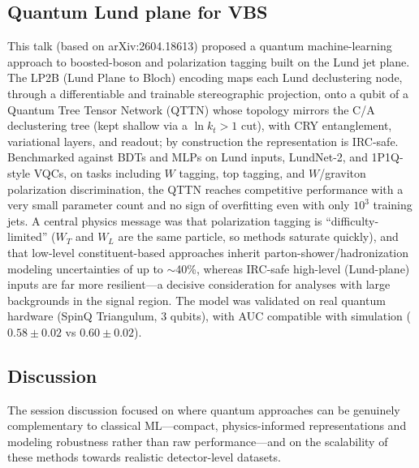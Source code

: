 \subsection{Quantum Lund plane for VBS}
This talk (based on arXiv:2604.18613) proposed a quantum machine-learning
approach to boosted-boson and polarization tagging built on the Lund jet plane.
The LP2B (Lund Plane to Bloch) encoding maps each Lund declustering node,
through a differentiable and trainable stereographic projection, onto a qubit
of a Quantum Tree Tensor Network (QTTN) whose topology mirrors the C/A
declustering tree (kept shallow via a $\ln k_t > 1$ cut), with CRY
entanglement, variational layers, and readout; by construction the
representation is IRC-safe. Benchmarked against BDTs and MLPs on Lund inputs,
LundNet-2, and 1P1Q-style VQCs, on tasks including $W$ tagging, top tagging,
and $W$/graviton polarization discrimination, the QTTN reaches competitive
performance with a very small parameter count and no sign of overfitting even
with only $10^3$ training jets. A central physics message was that polarization
tagging is ``difficulty-limited'' ($W_T$ and $W_L$ are the same particle, so
methods saturate quickly), and that low-level constituent-based approaches
inherit parton-shower/hadronization modeling uncertainties of up to
$\sim$40\%, whereas IRC-safe high-level (Lund-plane) inputs are far more
resilient---a decisive consideration for analyses with large backgrounds in
the signal region. The model was validated on real quantum hardware (SpinQ
Triangulum, 3 qubits), with AUC compatible with simulation
($0.58\pm0.02$ vs $0.60\pm0.02$).

\subsection{Discussion}
The session discussion focused on where quantum approaches can be genuinely
complementary to classical ML---compact, physics-informed representations and
modeling robustness rather than raw performance---and on the scalability of
these methods towards realistic detector-level datasets.
